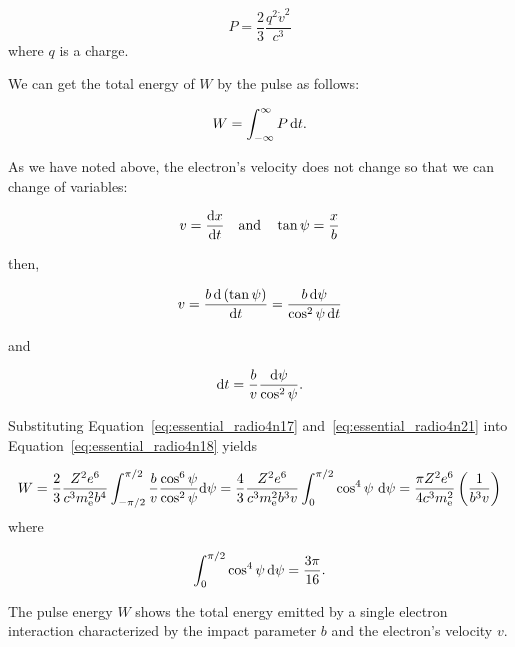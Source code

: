 \begin{equation}
    P = \frac{2}{3}\frac{q^2\dot{v}^2}{c^3}
\end{equation}
where $q$ is a charge.

We can get the total energy of $W$ by the pulse as follows:

\begin{equation}\label{eq:essential_radio4n18}
    W = \int^{\infty}_{-\infty} P\,\mathrm{d}t.
\end{equation}

As we have noted above, the electron's velocity does not change so that we can change of variables:

\begin{equation}\label{eq:essential_radio4n19}
    v = \frac{\mathrm{d} x}{\mathrm{d} t}\ \ \ \mathrm{and}\ \ \ \tan\psi = \frac{x}{b}
\end{equation}

then,

\begin{equation}\label{eq:essential_radio4n20}
    v=\frac{b\,\mathrm{d}\left(\tan \psi\right)}{\mathrm{d} t} = \frac{b\,\mathrm{d} \psi}{\cos ^{2}\psi\,\mathrm{d} t}
\end{equation}

and

\begin{equation}\label{eq:essential_radio4n21}
    \mathrm{d} t=\frac{b}{v} \frac{\mathrm{d} \psi}{\cos ^{2} \psi}.
\end{equation}

Substituting Equation~\ref{eq:essential_radio4n17} and~\ref{eq:essential_radio4n21} into Equation~\ref{eq:essential_radio4n18} yields

\begin{equation}\label{eq:essential_radio4n22}
    W=\frac{2}{3} \frac{Z^{2} e^{6}}{c^{3} m_{\mathrm{e}}^{2} b^{4}} \int_{-\pi / 2}^{\pi / 2} \frac{b}{v} \frac{\cos ^{6} \psi}{\cos ^{2} \psi} \mathrm{d} \psi=\frac{4}{3} \frac{Z^{2} e^{6}}{c^{3} m_{\mathrm{e}}^{2} b^{3} v} \int_{0}^{\pi / 2} \cos ^{4} \psi\ \mathrm{d} \psi = \frac{\pi Z^2 e^6}{4 c^3 m_{\mathrm{e}}^2}\left(\frac{1}{b^3v}\right)
\end{equation}
where

\begin{equation}\label{eq:integral_costo4}
    \int_{0}^{\pi / 2} \cos ^{4} \psi\,\mathrm{d} \psi=\frac{3 \pi}{16}.
\end{equation}

The pulse energy $W$ shows the total energy emitted by a single electron interaction characterized by the impact parameter $b$ and the electron's velocity $v$.\\ \vspace{0.2cm}

